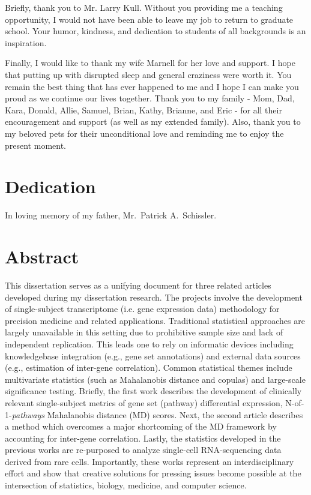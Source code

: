 \documentclass[final]{ua-thesis}
\numberwithin{equation}{section}
\begin{document}
Briefly, thank you to Mr. Larry Kull. Without you providing me a teaching opportunity, I would not have been able to leave my job to return to graduate school. Your humor, kindness, and dedication to students of all backgrounds is an inspiration.

Finally, I would like to thank my wife Marnell for her love and support. I hope that putting up with disrupted sleep and general craziness were worth it. You remain the best thing that has ever happened to me and I hope I can make you proud as we continue our lives together. Thank you to my family - Mom, Dad, Kara, Donald, Allie, Samuel, Brian, Kathy, Brianne, and Eric - for all their encouragement and support (as well as my extended family). Also, thank you to my beloved pets for their unconditional love and reminding me to enjoy the present moment.

\chapter*{Dedication}
\thispagestyle{topright}
\begin{center}In loving memory of my father, Mr.~Patrick A.~Schissler.\end{center}


\tableofcontents

\listoffigures
\listoftables

\chapter*{Abstract}
\noindent This dissertation serves as a unifying document for three related articles developed during my dissertation research. The projects involve the development of single-subject transcriptome (i.e. gene expression data) methodology for precision medicine and related applications. Traditional statistical approaches are largely unavailable in this setting due to prohibitive sample size and lack of independent replication. This leads one to rely on informatic devices including knowledgebase integration (e.g., gene set annotations) and external data sources (e.g., estimation of inter-gene correlation). Common statistical themes include multivariate statistics (such as Mahalanobis distance and copulas) and large-scale significance testing. Briefly, the first work describes the development of clinically relevant single-subject metrics of gene set (pathway) differential expression, N-of-1-\emph{pathways} Mahalanobis distance (MD) scores. Next, the second article describes a method which overcomes a major shortcoming of the MD framework by accounting for inter-gene correlation. Lastly, the statistics developed in the previous works are re-purposed to analyze single-cell RNA-sequencing data derived from rare cells. Importantly, these works represent an interdisciplinary effort and show that creative solutions for pressing issues become possible at the intersection of statistics, biology, medicine, and computer science.
\end{document}
